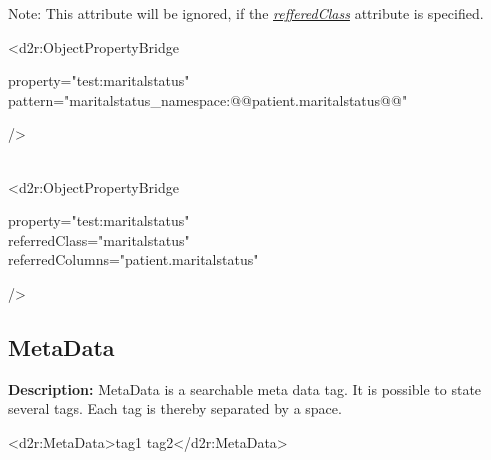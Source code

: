 Note:\newline
This attribute will be ignored, if the
\hyperref[refferedClassLabel]{\emph{refferedClass}} attribute is specified.
\EndAttribute

\begin{ExampleBox}
	<d2r:ObjectPropertyBridge 
	\begin{indention}{1cm}
		property="test:maritalstatus"\\
		pattern="maritalstatus\_namespace:@@patient.maritalstatus@@"
	\end{indention}
	/>
	
	\\
	<d2r:ObjectPropertyBridge 
	\begin{indention}{1cm}
		property="test:maritalstatus"\\
		referredClass="maritalstatus"\\
		referredColumns="patient.maritalstatus"
	\end{indention}
	/>
\end{ExampleBox}


\subsection{MetaData}
\textbf{Description:} \newline
MetaData is a searchable meta data tag. It is possible to state several tags. Each tag is thereby
separated by a space.


\begin{ExampleBox}
	<d2r:MetaData>tag1 tag2</d2r:MetaData> 
\end{ExampleBox}